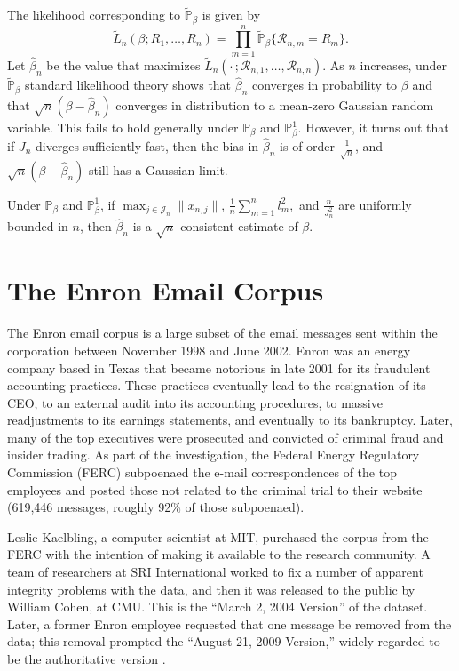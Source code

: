 \documentclass[aoas,preprint]{imsart}
\begin{document}
The likelihood corresponding to $\tilde{\mathbb{P}}_\beta$ is given by
\[
    \tilde{L}_n(\beta ; R_1, \ldots, R_n)
    =
    \prod_{m=1}^{n}
        \tilde{\mathbb{P}}_\beta\big\{ \mathcal{R}_{n,m} = R_m \}.
\]
Let $\hat \beta_n$ be the value that maximizes
\(
    \tilde{L}_n( \cdot\, ; \mathcal{R}_{n,1}, \ldots, \mathcal{R}_{n,n}).
\)
As $n$ increases, under $\tilde{\mathbb{P}}_\beta$ standard likelihood
theory shows that $\hat \beta_n$ converges in probability to $\beta$ and
that $\sqrt{n}(\beta - \hat \beta_n)$ converges in distribution to a
mean-zero Gaussian random variable.  This fails to hold generally under
$\mathbb{P}_\beta$ and $\mathbb{P}^1_\beta$.  However, it turns out
that if $J_n$ diverges sufficiently fast, then the bias in $\hat \beta_n$ is
of order $\tfrac{1}{\sqrt{n}}$, and $\sqrt{n}(\beta - \hat \beta_n)$ still
has a Gaussian limit.

\begin{theorem}
    Under $\mathbb{P}_\beta$ and $\mathbb{P}^1_\beta$,
    if $\max_{j \in \mathcal{J}_n} \|x_{n,j}\|$,
    \(
        \frac{1}{n} \sum_{m=1}^n l_m^2,
    \)
    and
    \(
        \frac{n}{J_n^2}
    \)
    are uniformly bounded in $n$, then $\hat \beta_n$ is a
    $\sqrt{n}$-consistent estimate of $\beta$.
\end{theorem}

\clearpage

\appendix

\section{The Enron Email Corpus}\label{S:enron-corpus}

The Enron email corpus is a large subset of the email messages sent within the
corporation between November 1998 and June 2002. Enron was an energy company
based in Texas that became notorious in late 2001 for its fraudulent
accounting practices. These practices eventually lead to the resignation of
its CEO, to an external audit into its accounting procedures, to massive
readjustments to its earnings statements, and eventually to its bankruptcy.
Later, many of the top executives were prosecuted and convicted of criminal
fraud and insider trading. As part of the investigation, the Federal Energy
Regulatory Commission (FERC) subpoenaed the e-mail correspondences of the top
employees and posted those not related to the criminal trial to their website
(619,446 messages, roughly 92\% of those subpoenaed).

Leslie Kaelbling, a computer scientist at MIT, purchased the corpus from the
FERC with the intention of making it available to the research community. A
team of researchers at SRI International worked to fix a number of apparent
integrity problems with the data, and then it was released to the public by
William Cohen, at CMU. This is the ``March 2, 2004 Version'' of the dataset.
Later, a former Enron employee requested that one message be removed from the
data; this removal prompted the ``August 21, 2009 Version,'' widely regarded
to be the authoritative version \cite{cohen2009enron}.
\end{document}
